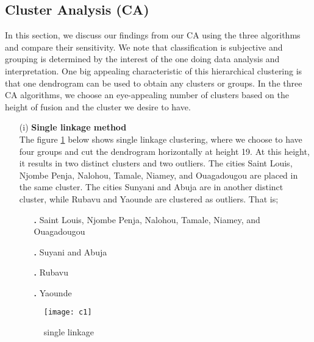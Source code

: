\documentclass[12pt,a4paper]{article}
\begin{document}
\subsection{Cluster Analysis (CA)}
In this section, we discuss our findings from our CA using the three algorithms and compare their sensitivity. We note that classification is subjective and grouping is determined by the interest of the one doing data analysis and interpretation. One big appealing characteristic of this hierarchical clustering is that one dendrogram can be used to obtain any clusters or groups. In the three CA algorithms, we choose an eye-appealing number of clusters based on the height of fusion and the cluster we desire to have.
\begin{enumerate}
\item[(i)]
\textbf{Single linkage method}\\
The figure \ref{fig 1} below shows single linkage clustering, where we choose to have four groups and cut the dendrogram horizontally at height 19.
At this height, it results in two distinct clusters and two outliers. The cities Saint Louis, Njombe Penja,  Nalohou, Tamale, Niamey, and Ouagadougou are placed in the same cluster. The cities Sunyani and Abuja are in another distinct cluster, while Rubavu and Yaounde are clustered as outliers.
 That is;
\begin{enumerate}
\item[\textbf{.}]Saint Louis, Njombe Penja, Nalohou, Tamale, Niamey, and Ouagadougou
\item[\textbf{.}]Suyani and Abuja
\item[\textbf{.}]Rubavu 
\item[\textbf{.}] Yaounde
\end{enumerate}
\begin{figure}[H]
\texttt{[image: c1]}
\centering
\caption{single linkage}
\label{fig 1}
\end{figure}
\end{enumerate}
\end{document}
